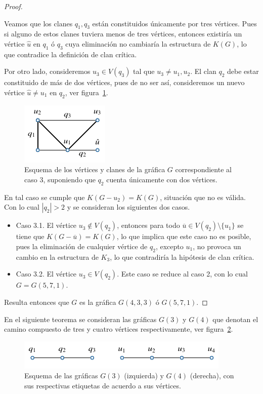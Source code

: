 \documentclass[12pt]{book}
\theoremstyle{definition}
\begin{document}
\begin{proof}
\begin{itemize}
Veamos que los clanes $q_1,q_3$ están constituidos únicamente por tres vértices. Pues si alguno de estos clanes tuviera menos de tres vértices, entonces existiría un vértice $\hat{u}$ en $q_1$ ó $q_3$ cuya eliminación no cambiaría la estructura de $K(G)$, lo que contradice la definición de clan crítica.

Por otro lado, consideremos $u_3\in V(q_3)$ tal que $u_3\neq u_1,u_2$. El clan $q_2$ debe estar constituido de más de dos vértices, pues de no ser así, consideremos un nuevo vértice $\hat{u}\neq u_1$ en $q_2$, ver figura~\ref{F5}.

\begin{figure}[!htbp]
	\centering
	\includegraphics[scale=1.2]{Fig4.pdf}
	\caption{Esquema de los vértices y clanes de la gráfica $G$ correspondiente al caso 3, suponiendo que $q_2$ cuenta únicamente con dos vértices.\label{F5}}
\end{figure}

En tal caso se cumple que $K(G-u_2)=K(G)$, situación que no es válida. Con lo cual $|q_2|>2$ y se consideran los siguientes dos casos.
\begin{itemize}
\item Caso 3.1.
El vértice $u_3\notin V(q_2)$, entonces para todo $\overline{u}\in V(q_2)\setminus\{u_1\}$ se tiene que $K(G-\overline{u})=K(G)$, lo que implica que este caso no es posible, pues la eliminación de cualquier vértice de $q_2$, excepto $u_1$, no provoca un cambio en la estructura de $K_3$, lo que contradiría la hipótesis de clan crítica.

\item Caso 3.2.
El vértice $u_3\in V(q_2)$. Este caso se reduce al caso 2, con lo cual $G=G(5,7,1)$.
\end{itemize}
\end{itemize}
Resulta entonces que $G$ es la gráfica $G(4,3,3)$ ó $G(5,7,1)$.
\end{proof}


En el siguiente teorema se consideran las gráficas $G(3)$ y $G(4)$ que denotan el camino compuesto de tres y cuatro vértices respectivamente, ver figura~\ref{F6}.

\begin{figure}[!htbp]
	\centering
	\includegraphics[scale=1.2]{Fig5.pdf}
	\caption{Esquema de las gráficas $G(3)$ (izquierda) y $G(4)$ (derecha), con sus respectivas etiquetas de acuerdo a sus vértices.\label{F6}}
\end{figure}
\end{document}

